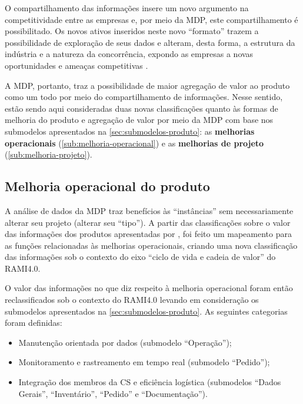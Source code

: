 O compartilhamento das informações insere um novo argumento na competitividade entre as empresas \cite{framling2013plm} e, por meio da MDP, este compartilhamento é possibilitado. Os novos ativos inseridos neste novo ``formato'' trazem a possibilidade de exploração de seus dados e alteram, desta forma, a estrutura da indústria e a natureza da concorrência, expondo as empresas a novas oportunidades e ameaças competitivas \cite{porter2015smartproducts}.

A MDP, portanto, traz a possibilidade de maior agregação de valor ao produto como um todo por meio do compartilhamento de informações. Nesse sentido, estão sendo aqui consideradas duas novas classificações quanto às formas de melhoria do produto e agregação de valor por meio da MDP com base nos submodelos apresentados na \autoref{sec:submodelos-produto}: as \textbf{melhorias operacionais} (\autoref{sub:melhoria-operacional}) e as \textbf{melhorias de projeto} (\autoref{sub:melhoria-projeto}).

\subsection{Melhoria operacional do produto}
\label{sub:melhoria-operacional}

A análise de dados da MDP traz benefícios às ``instâncias'' sem necessariamente alterar seu projeto (alterar seu ``tipo''). A partir das classificações sobre o valor das informações dos produtos apresentadas por , foi feito um mapeamento para as funções relacionadas às melhorias operacionais, criando uma nova classificação das informações sob o contexto do eixo ``ciclo de vida e cadeia de valor'' do RAMI4.0.

O valor das informações no que diz respeito à melhoria operacional foram então reclassificados sob o contexto do RAMI4.0 levando em consideração os submodelos apresentados na \autoref{sec:submodelos-produto}. As seguintes categorias foram definidas:

\begin{itemize}
	\item Manutenção orientada por dados (submodelo ``Operação'');
	\item Monitoramento e rastreamento em tempo real (submodelo ``Pedido'');
	\item Integração dos membros da CS e eficiência logística (submodelos ``Dados Gerais'', ``Inventário'', ``Pedido'' e ``Documentação'').
\end{itemize}


